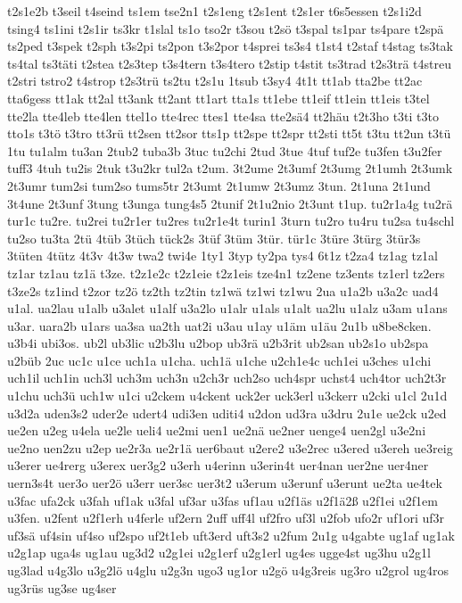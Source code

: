 {t2s1e2b
t3seil
t4seind
ts1em
tse2n1
t2s1eng
t2s1ent
t2s1er
t6s5essen
t2s1i2d
tsing4
ts1ini
t2s1ir
ts3kr
t1slal
ts1o
tso2r
t3sou
t2sö
t3spal
ts1par
ts4pare
t2spä
ts2ped
t3spek
t2sph
t3s2pi
ts2pon
t3s2por
t4sprei
ts3s4
t1st4
t2staf
t4stag
ts3tak
ts4tal
ts3täti
t2stea
t2s3tep
t3s4tern
t3s4tero
t2stip
t4stit
ts3trad
t2s3trä
t4streu
t2stri
tstro2
t4strop
t2s3trü
ts2tu
t2s1u
1tsub
t3sy4
4t1t
tt1ab
tta2be
tt2ac
tta6gess
tt1ak
tt2al
tt3ank
tt2ant
tt1art
tta1s
tt1ebe
tt1eif
tt1ein
tt1eis
t3tel
tte2la
tte4leb
tte4len
ttel1o
tte4rec
ttes1
tte4sa
tte2sä4
tt2häu
t2t3ho
t3ti
t3to
tto1s
t3tö
t3tro
tt3rü
tt2sen
tt2sor
tts1p
tt2spe
tt2spr
tt2sti
tt5t
t3tu
tt2un
t3tü
1tu
tu1alm
tu3an
2tub2
tuba3b
3tuc
tu2chi
2tud
3tue
4tuf
tuf2e
tu3fen
t3u2fer
tuff3
4tuh
tu2is
2tuk
t3u2kr
tul2a
t2um.
3t2ume
2t3umf
2t3umg
2t1umh
2t3umk
2t3umr
tum2si
tum2so
tums5tr
2t3umt
2t1umw
2t3umz
3tun.
2t1una
2t1und
3t4une
2t3unf
3tung
t3unga
tung4s5
2tunif
2t1u2nio
2t3unt
t1up.
tu2r1a4g
tu2rä
tur1c
tu2re.
tu2rei
tu2r1er
tu2res
tu2r1e4t
turin1
3turn
tu2ro
tu4ru
tu2sa
tu4schl
tu2so
tu3ta
2tü
4tüb
3tüch
tück2s
3tüf
3tüm
3tür.
tür1c
3türe
3türg
3tür3s
3tüten
4tütz
4t3v
4t3w
twa2
twi4e
1ty1
3typ
ty2pa
tys4
6t1z
t2za4
tz1ag
tz1al
tz1ar
tz1au
tz1ä
t3ze.
t2z1e2c
t2z1eie
t2z1eis
tze4n1
tz2ene
tz3ents
tz1erl
tz2ers
t3ze2s
tz1ind
t2zor
tz2ö
tz2th
tz2tin
tz1wä
tz1wi
tz1wu
2ua
u1a2b
u3a2c
uad4
u1al.
ua2lau
u1alb
u3alet
u1alf
u3a2lo
u1alr
u1als
u1alt
ua2lu
u1alz
u3am
u1ans
u3ar.
uara2b
u1ars
ua3sa
ua2th
uat2i
u3au
u1ay
u1äm
u1äu
2u1b
u8be8cken.
u3b4i
ubi3os.
ub2l
ub3lic
u2b3lu
u2bop
ub3rä
u2b3rit
ub2san
ub2s1o
ub2spa
u2büb
2uc
uc1c
u1ce
uch1a
u1cha.
uch1ä
u1che
u2ch1e4c
uch1ei
u3ches
u1chi
uch1il
uch1in
uch3l
uch3m
uch3n
u2ch3r
uch2so
uch4spr
uchst4
uch4tor
uch2t3r
u1chu
uch3ü
uch1w
u1ci
u2ckem
u4ckent
uck2er
uck3erl
u3ckerr
u2cki
u1cl
2u1d
u3d2a
uden3s2
uder2e
udert4
udi3en
uditi4
u2don
ud3ra
u3dru
2u1e
ue2ck
u2ed
ue2en
u2eg
u4ela
ue2le
ueli4
ue2mi
uen1
ue2nä
ue2ner
uenge4
uen2gl
u3e2ni
ue2no
uen2zu
u2ep
ue2r3a
ue2r1ä
uer6baut
u2ere2
u3e2rec
u3ered
u3ereh
ue3reig
u3erer
ue4rerg
u3erex
uer3g2
u3erh
u4erinn
u3erin4t
uer4nan
uer2ne
uer4ner
uern3s4t
uer3o
uer2ö
u3err
uer3sc
uer3t2
u3erum
u3erunf
u3erunt
ue2ta
ue4tek
u3fac
ufa2ck
u3fah
uf1ak
u3fal
uf3ar
u3fas
uf1au
u2f1äs
u2f1ä2ß
u2f1ei
u2f1em
u3fen.
u2fent
u2f1erh
u4ferle
uf2ern
2uff
uff4l
uf2fro
uf3l
u2fob
ufo2r
uf1ori
uf3r
uf3sä
uf4sin
uf4so
uf2spo
uf2t1eb
uft3erd
uft3s2
u2fum
2u1g
u4gabte
ug1af
ug1ak
u2g1ap
uga4s
ug1au
ug3d2
u2g1ei
u2g1erf
u2g1erl
ug4es
ugge4st
ug3hu
u2g1l
ug3lad
u4g3lo
u3g2lö
u4glu
u2g3n
ugo3
ug1or
u2gö
u4g3reis
ug3ro
u2grol
ug4ros
ug3rüs
ug3se
ug4ser
}
